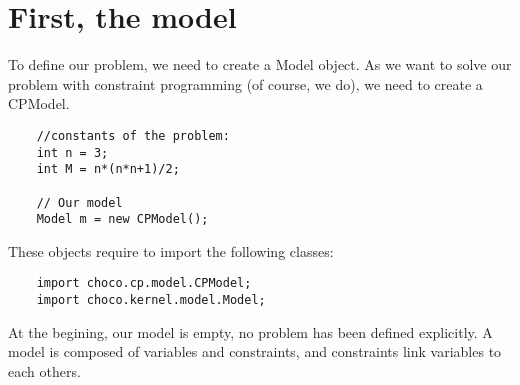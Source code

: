 \section{First, the model}\label{gettingstarted:first,themodel}\hypertarget{gettingstarted:first,themodel}{}
To define our problem, we need to create a Model object. As we want to solve our problem with constraint programming (of course, we do), we need to create a CPModel.
\begin{lstlisting}
	//constants of the problem:
	int n = 3;
	int M = n*(n*n+1)/2;
	
	// Our model
	Model m = new CPModel();
\end{lstlisting}
These objects require to import the following classes:
\begin{lstlisting}
	import choco.cp.model.CPModel;
	import choco.kernel.model.Model;
\end{lstlisting}

At the begining, our model is empty, no problem has been defined explicitly. A model is composed of variables and constraints, and constraints link variables to each others.

